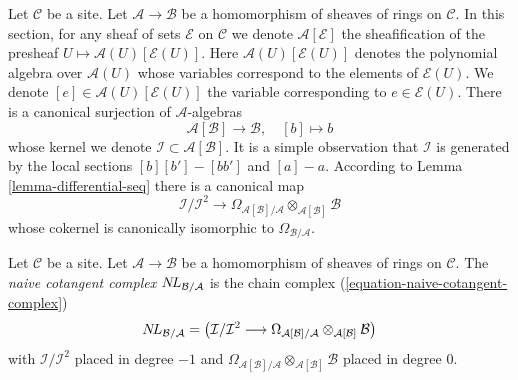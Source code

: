 \medskip\noindent
Let $\mathcal{C}$ be a site. Let $\mathcal{A} \to \mathcal{B}$ be a
homomorphism of sheaves of rings on $\mathcal{C}$. In this section,
for any sheaf of sets $\mathcal{E}$ on $\mathcal{C}$ we denote
 $\mathcal{A}[\mathcal{E}]$ the sheafification
of the presheaf $U \mapsto \mathcal{A}(U)[\mathcal{E}(U)]$. Here
$\mathcal{A}(U)[\mathcal{E}(U)]$
denotes the polynomial algebra over $\mathcal{A}(U)$
whose variables correspond to the elements of $\mathcal{E}(U)$.
We denote $[e] \in \mathcal{A}(U)[\mathcal{E}(U)]$ the variable
corresponding to $e \in \mathcal{E}(U)$.
There is a canonical surjection of $\mathcal{A}$-algebras
\begin{equation}
\label{equation-canonical-presentation}
\mathcal{A}[\mathcal{B}] \longrightarrow \mathcal{B},\quad [b] \longmapsto b
\end{equation}
whose kernel we denote $\mathcal{I} \subset \mathcal{A}[\mathcal{B}]$.
It is a simple observation that $\mathcal{I}$ is generated by the
local sections $[b][b'] - [bb']$ and $[a] - a$. According to
Lemma \ref{lemma-differential-seq} there is a canonical map
\begin{equation}
\label{equation-naive-cotangent-complex}
\mathcal{I}/\mathcal{I}^2
\longrightarrow
\Omega_{\mathcal{A}[\mathcal{B}]/\mathcal{A}}
\otimes_{\mathcal{A}[\mathcal{B}]} \mathcal{B}
\end{equation}
whose cokernel is canonically isomorphic to $\Omega_{\mathcal{B}/\mathcal{A}}$.

\begin{definition}
\label{definition-naive-cotangent-complex}
Let $\mathcal{C}$ be a site. Let $\mathcal{A} \to \mathcal{B}$ be a
homomorphism of sheaves of rings on $\mathcal{C}$.
The {\it naive cotangent complex} $\mathop{N\!L}\nolimits_{\mathcal{B}/\mathcal{A}}$
is the chain complex (\ref{equation-naive-cotangent-complex})
$$
\mathop{N\!L}\nolimits_{\mathcal{B}/\mathcal{A}} =
\left(\mathcal{I}/\mathcal{I}^2
\longrightarrow
\Omega_{\mathcal{A}[\mathcal{B}]/\mathcal{A}}
\otimes_{\mathcal{A}[\mathcal{B}]} \mathcal{B}\right)
$$
with $\mathcal{I}/\mathcal{I}^2$ placed in degree $-1$ and
$\Omega_{\mathcal{A}[\mathcal{B}]/\mathcal{A}}
\otimes_{\mathcal{A}[\mathcal{B}]} \mathcal{B}$
placed in degree $0$.
\end{definition}


